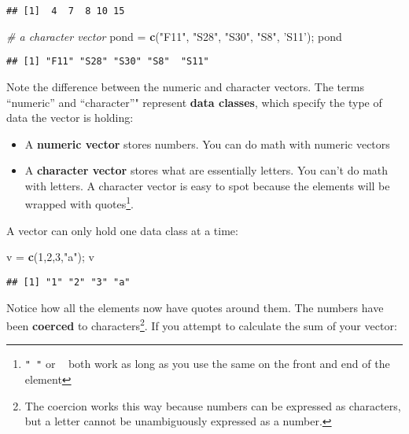 \documentclass[]{book}
\newenvironment{Shaded}{\begin{snugshade}}{\end{snugshade}}
\newcommand{\CommentTok}[1]{\textcolor[rgb]{0.56,0.35,0.01}{\textit{#1}}}
\newcommand{\DecValTok}[1]{\textcolor[rgb]{0.00,0.00,0.81}{#1}}
\newcommand{\KeywordTok}[1]{\textcolor[rgb]{0.13,0.29,0.53}{\textbf{#1}}}
\newcommand{\NormalTok}[1]{#1}
\newcommand{\StringTok}[1]{\textcolor[rgb]{0.31,0.60,0.02}{#1}}
\providecommand{\tightlist}{%
  \setlength{\itemsep}{0pt}\setlength{\parskip}{0pt}}
\let\rmarkdownfootnote\footnote%
\def\footnote{\protect\rmarkdownfootnote}
\begin{document}
\begin{verbatim}
## [1]  4  7  8 10 15
\end{verbatim}

\begin{Shaded}
\begin{Highlighting}[]
\CommentTok{# a character vector}
\NormalTok{pond =}\StringTok{ }\KeywordTok{c}\NormalTok{(}\StringTok{"F11"}\NormalTok{, }\StringTok{"S28"}\NormalTok{, }\StringTok{"S30"}\NormalTok{, }\StringTok{"S8"}\NormalTok{, }\StringTok{'S11'}\NormalTok{); pond}
\end{Highlighting}
\end{Shaded}

\begin{verbatim}
## [1] "F11" "S28" "S30" "S8"  "S11"
\end{verbatim}

Note the difference between the numeric and character vectors. The terms ``numeric'' and ``character''" represent \textbf{data classes}, which specify the type of data the vector is holding:

\begin{itemize}
\tightlist
\item
  A \textbf{numeric vector} stores numbers. You can do math with numeric vectors
\item
  A \textbf{character vector} stores what are essentially letters. You can't do math with letters. A character vector is easy to spot because the elements will be wrapped with quotes\footnote{\texttt{"\ "} or \texttt{\textquotesingle{}\ \textquotesingle{}} both work as long as you use the same on the front and end of the element}.
\end{itemize}

A vector can only hold one data class at a time:

\begin{Shaded}
\begin{Highlighting}[]
\NormalTok{v =}\StringTok{ }\KeywordTok{c}\NormalTok{(}\DecValTok{1}\NormalTok{,}\DecValTok{2}\NormalTok{,}\DecValTok{3}\NormalTok{,}\StringTok{"a"}\NormalTok{); v}
\end{Highlighting}
\end{Shaded}

\begin{verbatim}
## [1] "1" "2" "3" "a"
\end{verbatim}

Notice how all the elements now have quotes around them. The numbers have been \textbf{coerced} to characters\footnote{The coercion works this way because numbers can be expressed as characters, but a letter cannot be unambiguously expressed as a number.}. If you attempt to calculate the sum of your vector:
\end{document}

